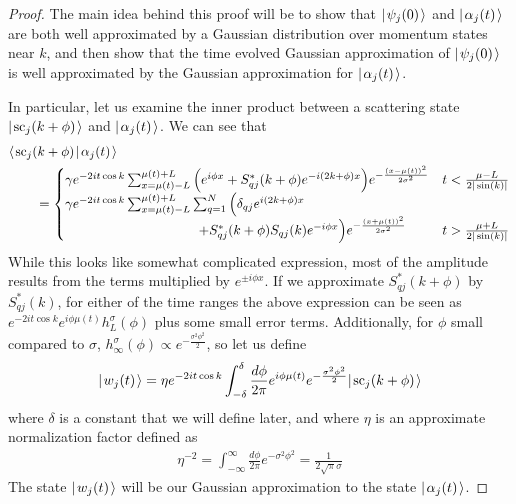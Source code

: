 \documentclass[../thesis-main/thesis-main]{subfiles}
\begin{document}
\begin{proof}



The main idea behind this proof will be to show that $|\mspace{2mu} \psi_j(0) \mspace{2mu} \rangle$ and $|\mspace{2mu} \alpha_j(t) \mspace{2mu} \rangle$ are both well approximated by a Gaussian distribution over momentum states near $k$, and then show that the time evolved Gaussian approximation of $|\mspace{2mu} \psi_j(0) \mspace{2mu} \rangle$ is well approximated by the Gaussian approximation for $|\mspace{2mu} \alpha_j(t) \mspace{2mu} \rangle$.  

In particular, let us examine the inner product between a scattering state $|\mspace{2mu} \text{sc}_j(k+\phi) \mspace{2mu} \rangle$ and $|\mspace{2mu} \alpha_j(t) \mspace{2mu} \rangle$.  We can see that
\begin{align}
  &\langle\mspace{2mu} \text{sc}_j(k+\phi) \mspace{2mu} | \mspace{2mu} \alpha_j(t)\mspace{2mu} \rangle\nonumber\\
  &\qquad= \begin{cases} 
      \gamma e^{-2 i t \cos k} \sum_{x=\mu(t)-L}^{\mu(t)+L} \Big(e^{i \phi x} + S_{qj}^*(k+\phi) e^{-i(2k + \phi)x}\Big) e^{ -\frac{(x-\mu(t))^2}{2\sigma^2}}
        & t < \frac{\mu - L}{2|\sin(k)|}\\
      \gamma e^{-2 i t \cos k} \sum_{x=\mu(t)-L}^{\mu(t)+L} \sum_{q=1}^N \Big(\delta_{qj} e^{i (2k+\phi) x}\\
      \qquad \qquad \qquad \qquad\qquad  + S_{qj}^*(k+\phi) S_{qj}(k) e^{-i\phi x}\Big) e^{ -\frac{(x+\mu(t))^2}{2\sigma^2}}& t > \frac{\mu + L}{2|\sin(k)|}
      \end{cases} 
 \end{align}
While this looks like somewhat complicated expression, most of the amplitude results from the terms multiplied by $e^{\pm i \phi x}$.  If we approximate $S_{qj}^*(k+\phi)$ by $S_{qj}^*(k)$, for either of the time ranges the above expression can be seen as $e^{-2it \cos k} e^{ i \phi \mu(t)} h_L^\sigma(\phi)$ plus some small error terms.  Additionally, for $\phi$ small compared to $\sigma$, $h_\infty^\sigma(\phi) \propto e^{-\frac{\sigma^2\phi^2}{2}}$,  so let us define
\begin{align}
  |\mspace{2mu} w_j(t) \mspace{2mu} \rangle = \eta e^{- 2 i t \cos k}\int_{-\delta}^{\delta} \frac{d\phi}{2\pi} e^{ i \phi \mu(t)} e^{-\frac{\sigma^2\phi^2}{2}}|\mspace{2mu} \text{sc}_{j}(k+\phi) \mspace{2mu} \rangle \label{eq:gaussian_w_defn}
\end{align}
where $\delta$ is a constant that we will define later, and where $\eta$ is an approximate normalization factor defined as
\begin{align}
  \eta^{-2} = \int_{-\infty}^{\infty} \frac{d\phi}{2\pi} e^{-\sigma^2\phi^2} = \frac{1}{2 \sqrt{\pi} \sigma}
\end{align}
The state $|\mspace{2mu} w_j(t) \mspace{2mu} \rangle$ will be our Gaussian approximation to the state $|\mspace{2mu} \alpha_j(t) \mspace{2mu} \rangle$.  


\end{proof}
\end{document}

